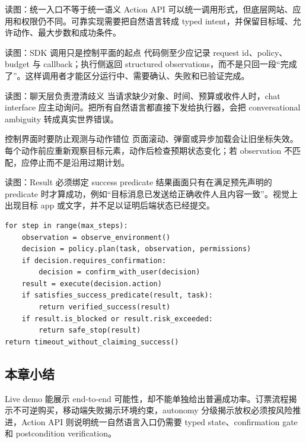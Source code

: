 
\begin{knowledgebox}{读图：统一入口不等于统一语义}
Action API 可以统一调用形式，但底层网站、应用和权限仍不同。可靠实现需要把自然语言转成 typed intent，并保留目标域、允许动作、最大步数和成功条件。
\end{knowledgebox}


\begin{knowledgebox}{读图：SDK 调用只是控制平面的起点}
代码侧至少应记录 request id、policy、budget 与 callback；执行侧返回 structured observations，而不是只回一段“完成了”。这样调用者才能区分运行中、需要确认、失败和已验证完成。
\end{knowledgebox}


\begin{knowledgebox}{读图：聊天层负责澄清歧义}
当请求缺少对象、时间、预算或收件人时，chat interface 应主动询问。把所有自然语言都直接下发给执行器，会把 conversational ambiguity 转成真实世界错误。
\end{knowledgebox}


\begin{warningbox}{控制界面时要防止观测与动作错位}
页面滚动、弹窗或异步加载会让旧坐标失效。每个动作前应重新观察目标元素，动作后检查预期状态变化；若 observation 不匹配，应停止而不是沿用过期计划。
\end{warningbox}


\begin{knowledgebox}{读图：Result 必须绑定 success predicate}
结果画面只有在满足预先声明的 predicate 时才算成功，例如“目标消息已发送给正确收件人且内容一致”。视觉上出现目标 app 或文字，并不足以证明后端状态已经提交。
\end{knowledgebox}

\begin{lstlisting}[caption={Action API 的 observe-act-verify 控制器}]
for step in range(max_steps):
    observation = observe_environment()
    decision = policy.plan(task, observation, permissions)
    if decision.requires_confirmation:
        decision = confirm_with_user(decision)
    result = execute(decision.action)
    if satisfies_success_predicate(result, task):
        return verified_success(result)
    if result.is_blocked or result.risk_exceeded:
        return safe_stop(result)
return timeout_without_claiming_success()
\end{lstlisting}

\subsection{本章小结}

Live demo 能展示 end-to-end 可能性，却不能单独给出普遍成功率。订票流程揭示不可逆购买，移动端失败揭示环境约束，autonomy 分级揭示放权必须按风险推进，Action API 则说明统一自然语言入口仍需要 typed state、confirmation gate 和 postcondition verification。


